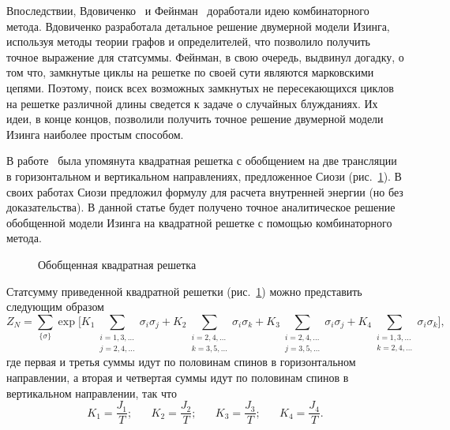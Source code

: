 \documentclass[utf8,12pt]{jetp}
\begin{document}
Впоследствии, Вдовиченко~\cite{vdovichenko1964, vdovichenko1965} и Фейнман~\cite{feynman1972} доработали идею комбинаторного метода. Вдовиченко разработала детальное решение двумерной модели Изинга, используя методы теории графов и определителей, что позволило получить точное выражение для статсуммы. Фейнман, в свою очередь, выдвинул догадку, о том что, замкнутые циклы на решетке по своей сути являются марковскими цепями. Поэтому, поиск всех возможных замкнутых не пересекающихся циклов на решетке различной длины сведется к задаче о случайных блужданиях. Их идеи, в конце концов, позволили получить точное решение двумерной модели Изинга наиболее простым способом.

В работе~\cite{generalizedIsing2021} была упомянута квадратная решетка с обобщением на две трансляции в горизонтальном и вертикальном направлениях, предложенное Сиози (рис.~\ref{gen}). В своих работах Сиози \cite{syozi1972} предложил формулу для расчета внутренней энергии (но без доказательства). В данной статье будет получено точное аналитическое решение обобщенной модели Изинга на квадратной решетке с помощью комбинаторного метода.

\begin{figure}[h]
	\caption{Обобщенная квадратная решетка}
	\label{gen}
\end{figure}

Статсумму приведенной квадратной решетки (рис.~\ref{gen}) можно представить следующим образом 
\begin{equation}
Z_{N} = \sum_{\{\sigma\}} \exp{\bigg[ K_1 \sum_{\substack{i = 1,3,\dots \\ j = 2,4,\dots}} \sigma_i \sigma_j + K_2 \sum_{\substack{i = 2,4,\dots \\ k = 3,5,\dots}} \sigma_i \sigma_k + K_3 \sum_{\substack{i = 2,4,\dots \\ j = 3,5,\dots}} \sigma_i \sigma_j + K_4 \sum_{\substack{i = 1,3,\dots \\ k = 2,4,\dots}} \sigma_i \sigma_k\bigg]},
\end{equation}
где первая и третья суммы идут по половинам спинов в горизонтальном направлении,  а вторая и четвертая суммы идут по половинам спинов в вертикальном направлении, так что
\begin{equation*}
K_1 = \frac{J_1}{T}; \;\;\;\;\;\; K_2 = \frac{J_2}{T};\;\;\;\;\;\; K_3 = \frac{J_3}{T};\;\;\;\;\;\;K_4 = \frac{J_4}{T}.
\end{equation*}
\end{document}
